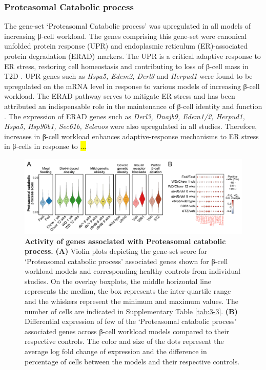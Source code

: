\subsubsection{Proteasomal Catabolic process}
The gene-set `Proteasomal Catabolic process' was upregulated in all models of increasing β-cell workload. The genes comprising this gene-set were canonical unfolded protein response (UPR) and endoplasmic reticulum (ER)-associated protein degradation (ERAD) markers. The UPR is a critical adaptive response to ER stress, restoring cell homeostasis and contributing to loss of β-cell mass in T2D \textbf{\cite{oppenlander_vertical_2021,fonseca_endoplasmic_2011,bilekova_pharmacological_2021}}. UPR genes such as \textit{Hspa5, Edem2, Derl3} and \textit{Herpud1} were found to be upregulated on the mRNA level in response to various models of increasing β-cell workload. The ERAD pathway serves to mitigate ER stress and has been attributed an indispensable role in the maintenance of β-cell identity and function \textbf{\cite{oppenlander_vertical_2021,hu_endoplasmic_2019,shrestha_sel1l-hrd1_2020}}. The expression of ERAD genes such as \textit{Derl3, Dnajb9, Edem1/2, Herpud1, Hspa5, Hsp90b1, Sec61b, Selenos} were also upregulated in all studies. Therefore, increases in β-cell workload enhances adaptive-response mechanisms to ER stress in β-cells in response to \hl{...}

\begin{figure}[H]
\centering
\includegraphics[width=\linewidth]{Chapter5/Fig/F3-13-04.png}
\caption[Gene-set scoring of `\textit{Proteasomal catabolic process}']{\textbf{Activity of genes associated with Proteasomal catabolic process.} \textbf{(A)} Violin plots depicting the gene-set score for `Proteasomal catabolic process' associated genes shown for β-cell workload models and corresponding healthy controls from individual studies. On the overlay boxplots, the middle horizontal line represents the median, the box represents the inter-quartile range and the whiskers represent the minimum and maximum values. The number of cells are indicated in Supplementary Table \ref{tab:3-3}. \textbf{(B)} Differential expression of few of the `Proteasomal catabolic process' associated genes across β-cell workload models compared to their respective controls. The color and size of the dots represent the average log fold change of expression and the difference in percentage of cells between the models and their respective controls.}
\label{fig:3-13-4}
\end{figure}



